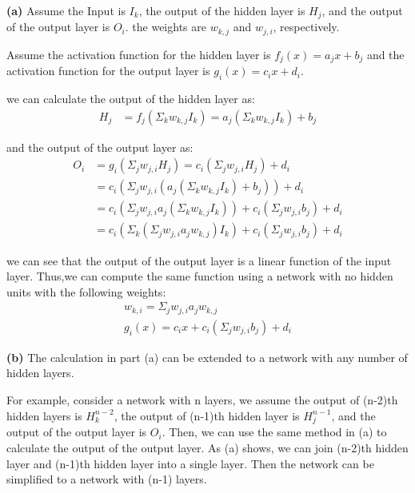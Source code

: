 \documentclass[cn,12pt]{homework}
\begin{document}
\begin{solution}
    \quad

\textbf{(a)}
    Assume the Input is $I_k$, the output of the hidden layer is $H_j$, and the output of the output layer is $O_i$.
    the weights are $w_{k,j}$ and $w_{j,i}$, respectively.

    Assume the activation function for the hidden layer is $f_j(x) = a_j x + b_j$ and the activation function for the output layer is $g_i(x) = c_i x + d_i$.

    we can calculate the output of the hidden layer as:
\begin{align*}
    H_j &= f_j(\Sigma_k w_{k,j} I_k) = a_j (\Sigma_k w_{k,j} I_k) + b_j 
\end{align*}

    and the output of the output layer as:
\begin{align*}
    O_i &= g_i(\Sigma_j w_{j,i} H_j) = c_i (\Sigma_j w_{j,i} H_j) + d_i \\
        &= c_i (\Sigma_j w_{j,i} (a_j (\Sigma_k w_{k,j} I_k) + b_j)) + d_i \\
        &= c_i (\Sigma_j w_{j,i} a_j (\Sigma_k w_{k,j} I_k)) + c_i (\Sigma_j w_{j,i} b_j) + d_i \\
        &= c_i (\Sigma_k (\Sigma_j w_{j,i} a_j w_{k,j}) I_k) + c_i (\Sigma_j w_{j,i} b_j) + d_i
\end{align*}

    we can see that the output of the output layer is a linear function of the input layer. Thus,we can compute the same function using a network with no hidden units with the following weights:
\begin{align*}
    w_{k,i} = \Sigma_j w_{j,i} a_j w_{k,j} \\
    g_i(x) = c_i x + c_i(\Sigma_j w_{j,i} b_j) + d_i
\end{align*}

\textbf{(b)}
    The calculation in part (a) can be extended to a network with any number of hidden layers. 

    For example, consider a network with n layers, we assume the output of (n-2)th hidden layers is $H_k^{n-2}$, the output of (n-1)th hidden layer is $H_j^{n-1}$, and the output of the output layer is $O_i$.
    Then, we can use the same method in (a) to calculate the output of the output layer. As (a) shows, we can join (n-2)th hidden layer and (n-1)th hidden layer into a single layer. Then the network can be simplified to a network with (n-1) layers.


\end{solution}
\end{document}
